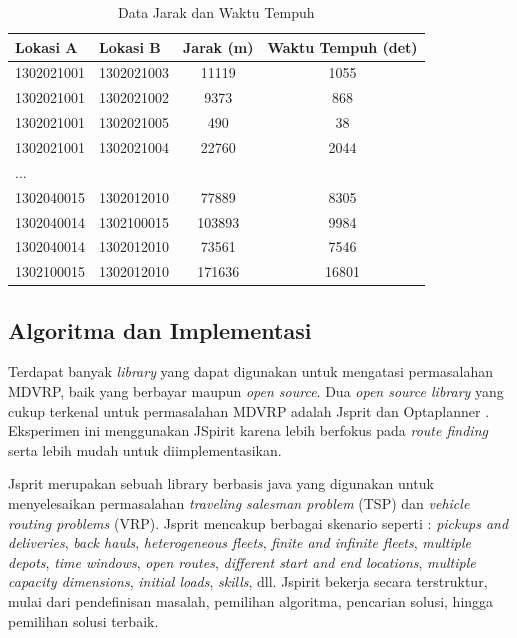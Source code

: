 \begin{table}[!]
	\centering
	\caption{Data Jarak dan Waktu Tempuh}
	\label{tbl:distance_duration_matrix}
	\begin{tabular}{llcc}
		\toprule
		Lokasi A & Lokasi B & Jarak (m) & Waktu Tempuh (det)\\
		\midrule
		1302021001 & 1302021003 & 11119 & 1055\\
		1302021001 & 1302021002 & 9373 & 868\\
		1302021001 & 1302021005 & 490 & 38\\
		1302021001 & 1302021004 & 22760 & 2044\\
		...\\
		1302040015 & 1302012010 & 77889 & 8305\\
		1302040014 & 1302100015 & 103893 & 9984\\
		1302040014 & 1302012010 & 73561 & 7546\\
		1302100015 & 1302012010 & 171636 & 16801\\
		\bottomrule
	\end{tabular}
\end{table}


\subsection{Algoritma dan Implementasi}
\label{ssec:alg-impl}
Terdapat banyak \textit{library} yang dapat digunakan untuk mengatasi permasalahan MDVRP, baik yang berbayar maupun \textit{open source}. Dua \textit{open source library} yang cukup terkenal untuk permasalahan MDVRP adalah Jsprit \citep{jsprit_jsprit_2014} dan Optaplanner \citep{optaplanner_constraint_2016}. Eksperimen ini menggunakan JSpirit karena lebih berfokus pada \textit{route finding} serta lebih mudah untuk diimplementasikan. 


Jsprit merupakan sebuah library berbasis java yang digunakan untuk menyelesaikan permasalahan \textit{traveling salesman problem} (TSP) dan \textit{vehicle routing problems} (VRP). Jsprit mencakup berbagai skenario seperti : \textit{pickups and deliveries}, \textit{back hauls}, \textit{heterogeneous fleets}, \textit{finite and infinite fleets}, \textit{multiple depots}, \textit{time windows}, \textit{open routes}, \textit{different start and end locations}, \textit{multiple capacity dimensions}, \textit{initial loads}, \textit{skills}, dll. Jspirit bekerja secara terstruktur, mulai dari pendefinisan masalah, pemilihan algoritma, pencarian solusi, hingga pemilihan solusi terbaik.


